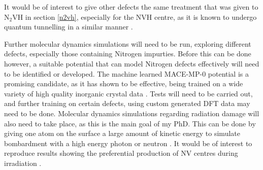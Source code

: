 \documentclass[10pt,a4paper,twocolumn,twoside]{extarticle}
\newcommand{\ntvh}{N$_2$VH}
\begin{document}
It would be of interest to give other defects the same treatment that was given to {\ntvh} in section \ref{n2vh}, especially for the NVH centre, as it is known to undergo quantum tunnelling in a similar manner \cite{Peaker,Shaw_QT_VH}.  

Further molecular dynamics simulations will need to be run, exploring different defects, especially those containing Nitrogen impurties. Before this can be done however, a suitable potential that can model Nitrogen defects effectively will need to be identified or developed. The machine learned MACE-MP-0 potential is a promising candidate, as it has shown to be effective, being trained on a wide variety of high quality inorganic crystal data \cite{MACE}. Tests will need to be carried out, and further training on certain defects, using custom generated DFT data may need to be done. Molecular dynamics simulations regarding radiation damage will also need to take place, as this is the main goal of my PhD. This can be done by giving one atom on the surface a large amount of kinetic energy to simulate bombardment with a high energy photon or neutron \cite{radiation}. It would be of interest to reproduce results showing the preferential production of NV centres during irradiation \cite{Deak}. %

\printbibliography
\end{document}

